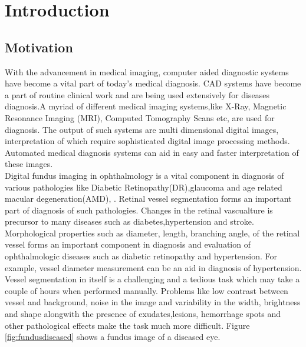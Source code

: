
\chapter{Introduction}  %

\ifpdf
\graphicspath{{Chapter1/Figs/Raster/}{Chapter1/Figs/PDF/}{Chapter1/Figs/}}
\else
\graphicspath{{Chapter1/Figs/Vector/}{Chapter1/Figs/}}
\fi


\section{Motivation}
With the advancement in medical imaging, computer aided diagnostic systems have become a vital part of today's medical diagnosis\cite{doi2007computer}. CAD systems have become a part of routine clinical work and are being used extensively for diseases diagnosis.A myriad of different medical imaging systems,like X-Ray, Magnetic Resonance Imaging (MRI), Computed Tomography Scans etc, are used for diagnosis. The output of such systems are multi dimensional digital images, interpretation of which require sophisticated digital image processing methods. Automated medical diagnosis systems can aid in easy and faster interpretation of these images.\\	

Digital fundus imaging in ophthalmology is a vital component in diagnosis of various pathologies like Diabetic Retinopathy(DR),glaucoma and age related macular degeneration(AMD), . Retinal vessel segmentation forms an important part of diagnosis of such pathologies. Changes in the retinal vascualture is precursor to many diseases such as diabetes,hypertension and stroke. Morphological properties such as diameter, length, branching angle, of the retinal vessel forms an important component in diagnosis and evaluation of ophthalmologic diseases such as diabetic retinopathy \cite{sinthanayothin2002automated} and hypertension. For example, vessel diameter measurement can be an aid in diagnosis of hypertension\cite{calvo2011automatic}.\\

Vessel segmentation in itself is a challenging and a tedious task which may take a couple of hours when performed manually. Problems like low contrast between vessel and background, noise in the image and variability in the width, brightness and shape alongwith the presence of exudates,lesions, hemorrhage spots and other pathological effects make the task much more difficult. Figure \ref{fig:fundusdiseased} shows a fundus image of a diseased eye.\\

